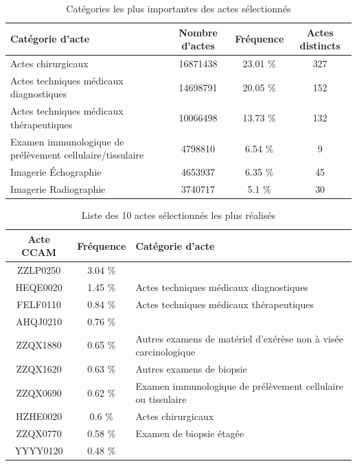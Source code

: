 \begin{table}[!ht]
\centering
\caption{Catégories les plus importantes des actes sélectionnés} 
\label{cat_select}
\begin{tabular}{l|ccc}
  \hline
Catégorie d'acte & Nombre d'actes & Fréquence & Actes distincts \\ 
  \hline
Actes chirurgicaux & 16871438 & 23.01 \% & 327 \\ 
  Actes techniques médicaux diagnostiques & 14698791 & 20.05 \% & 152 \\ 
  Actes techniques médicaux thérapeutiques & 10066498 & 13.73 \% & 132 \\ 
  Examen immunologique de prélèvement cellulaire/tissulaire & 4798810 & 6.54 \% &   9 \\ 
  Imagerie Échographie & 4653937 & 6.35 \% &  45 \\ 
  Imagerie Radiographie & 3740717 & 5.1 \% &  30 \\  
   \hline
\end{tabular}
\end{table}


\begin{table}[!ht]
\centering
\caption{Liste des 10 actes sélectionnés les plus réalisés} 
\label{actes_select}
\begin{tabular}{ccl}
  \hline
Acte CCAM & Fréquence & Catégorie d'acte \\ 
  \hline
ZZLP0250 & 3.04 \% &  \\ 
  HEQE0020 & 1.45 \% & Actes techniques médicaux diagnostiques \\ 
  FELF0110 & 0.84 \% & Actes techniques médicaux thérapeutiques \\ 
  AHQJ0210 & 0.76 \% &  \\ 
  ZZQX1880 & 0.65 \% & Autres examens de matériel d'exérèse non à visée carcinologique \\ 
  ZZQX1620 & 0.63 \% & Autres examens de biopsie \\ 
  ZZQX0690 & 0.62 \% & Examen immunologique de prélèvement cellulaire ou tissulaire \\ 
  HZHE0020 & 0.6 \% & Actes chirurgicaux \\ 
  ZZQX0770 & 0.58 \% & Examen de biopsie étagée \\ 
  YYYY0120 & 0.48 \% &  \\ 
   \hline
\end{tabular}
\end{table}



